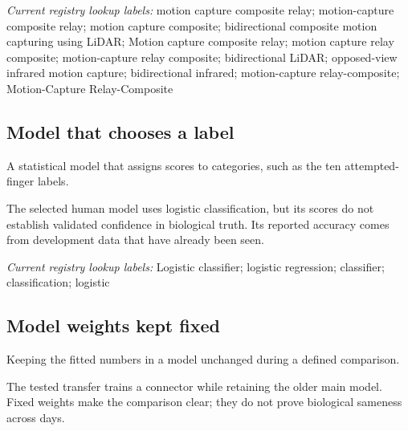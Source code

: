 \noindent\textit{Current registry lookup labels:} motion capture composite relay; motion-capture composite relay; motion capture composite; bidirectional composite motion capturing using LiDAR; Motion capture composite relay; motion capture relay composite; motion-capture relay composite; bidirectional LiDAR; opposed-view infrared motion capture; bidirectional infrared; motion-capture relay-composite; Motion-Capture Relay-Composite\par

\begin{samepage}
\subsection*{Model that chooses a label}
\noindent A statistical model that assigns scores to categories, such as the ten attempted-finger labels.\par
\end{samepage}
\begin{samepage}
\noindent The selected human model uses logistic classification, but its scores do not establish validated confidence in biological truth. Its reported accuracy comes from development data that have already been seen.\par\nopagebreak[4]

\end{samepage}


\noindent\textit{Current registry lookup labels:} Logistic classifier; logistic regression; classifier; classification; logistic\par

\begin{samepage}
\subsection*{Model weights kept fixed}
\noindent Keeping the fitted numbers in a model unchanged during a defined comparison.\par
\end{samepage}
\begin{samepage}
\noindent The tested transfer trains a connector while retaining the older main model. Fixed weights make the comparison clear; they do not prove biological sameness across days.\par\nopagebreak[4]

\end{samepage}


